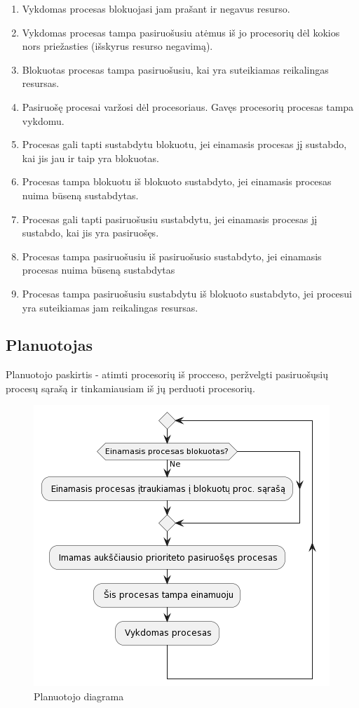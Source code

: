 \documentclass{VUMIFInfKursinis}
\begin{document}
\begin{enumerate}
	\item Vykdomas procesas blokuojasi jam prašant ir negavus resurso.
	\item Vykdomas procesas tampa pasiruošusiu atėmus iš jo procesorių dėl kokios
	nors priežasties (išskyrus resurso negavimą).
	\item Blokuotas procesas tampa pasiruošusiu, kai yra suteikiamas reikalingas
	resursas.
	\item Pasiruošę procesai varžosi dėl procesoriaus. Gavęs procesorių procesas tampa
	vykdomu.
	\item Procesas gali tapti sustabdytu blokuotu, jei einamasis procesas jį sustabdo, kai
	jis jau ir taip yra blokuotas.
	\item Procesas tampa blokuotu iš blokuoto sustabdyto, jei einamasis procesas nuima
	būseną sustabdytas.
	\item Procesas gali tapti pasiruošusiu sustabdytu, jei einamasis procesas jį sustabdo,
	kai jis yra pasiruošęs.
	\item Procesas tampa pasiruošusiu iš pasiruošusio sustabdyto, jei einamasis procesas
	nuima būseną sustabdytas
	\item Procesas tampa pasiruošusiu sustabdytu iš blokuoto sustabdyto, jei procesui
	yra suteikiamas jam reikalingas resursas.
\end{enumerate}


\subsection{Planuotojas}

Planuotojo paskirtis - atimti procesorių iš procceso, peržvelgti pasiruošųsių procesų sąrašą ir tinkamiausiam iš jų perduoti procesorių.

\begin{figure}[H]
	\centering	
	\includegraphics[scale=0.65]{img/scheduler}
	\caption{Planuotojo diagrama}   %
	\label{img:scheduler}
\end{figure}
\end{document}

